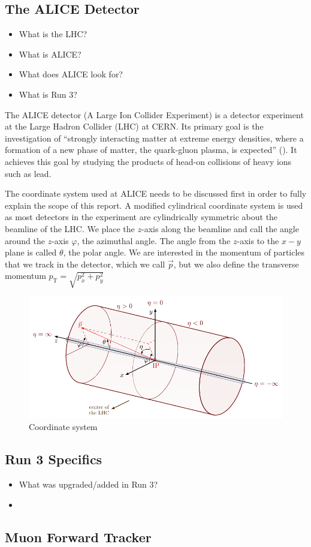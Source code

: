 \subsection{The ALICE Detector}
\begin{itemize}
    \item What is the LHC?
    \item What is ALICE?
    \item What does ALICE look for?
    \item What is Run 3?
\end{itemize}
The ALICE detector (A Large Ion Collider Experiment) is a detector experiment at the Large Hadron Collider (LHC) at CERN. Its primary goal is the investigation of ``strongly interacting matter at extreme energy densities, where a formation of a new phase of matter, the quark-gluon plasma, is expected'' (\cite{ALICE_LOI}). It achieves this goal by studying the products of head-on collisions of heavy ions such as lead. 



The coordinate system used at ALICE needs to be discussed first in order to fully explain the scope of this report. A modified cylindrical coordinate system is used as most detectors in the experiment are cylindrically symmetric about the beamline of the LHC. We place the $z$-axis along the beamline and call the angle around the $z$-axis $\varphi$, the azimuthal angle. The angle from the $z$-axis to the $x-y$ plane is called $\theta$, the polar angle. 
We are interested in the momentum of particles that we track in the detector, which we call $\vec{p}$, but we also define the transverse momentum $p_{\mathrm{T}}=\sqrt{p_x^2 + p_y^2}$

\begin{figure}[h]
    \begin{center}
        \includegraphics[width=.8\textwidth]{Figs/coords.pdf}
        \caption{Coordinate system \cite{coords}}
        \label{fig:coords}
    \end{center}
\end{figure}


\subsection{Run 3 Specifics}
\begin{itemize}
    \item What was upgraded/added in Run 3?
    \item 
\end{itemize}

\subsection{Muon Forward Tracker}